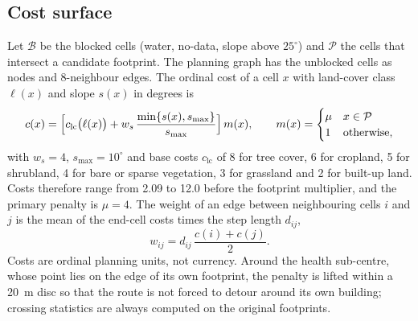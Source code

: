 \subsection{Cost surface}
Let $\mathcal{B}$ be the blocked cells (water, no-data, slope above $25^{\circ}$) and $\mathcal{P}$ the cells that intersect a candidate footprint. The planning graph has the unblocked cells as nodes and 8-neighbour edges. The ordinal cost of a cell $x$ with land-cover class $\ell(x)$ and slope $s(x)$ in degrees is
\begin{equation}
c(x)=\Bigl[c_{\mathrm{lc}}\bigl(\ell(x)\bigr)+w_s\,\frac{\min\{s(x),s_{\max}\}}{s_{\max}}\Bigr]\,m(x),\qquad m(x)=\begin{cases}\mu & x\in\mathcal{P}\\ 1 & \text{otherwise,}\end{cases}
\label{eq:cell}
\end{equation}
with $w_s=4$, $s_{\max}=10^{\circ}$ and base costs $c_{\mathrm{lc}}$ of 8 for tree cover, 6 for cropland, 5 for shrubland, 4 for bare or sparse vegetation, 3 for grassland and 2 for built-up land. Costs therefore range from 2.09 to 12.0 before the footprint multiplier, and the primary penalty is $\mu=4$. The weight of an edge between neighbouring cells $i$ and $j$ is the mean of the end-cell costs times the step length $d_{ij}$,
\begin{equation}
w_{ij}=d_{ij}\,\frac{c(i)+c(j)}{2}.
\label{eq:edge}
\end{equation}
Costs are ordinal planning units, not currency. Around the health sub-centre, whose point lies on the edge of its own footprint, the penalty is lifted within a 20~m disc so that the route is not forced to detour around its own building; crossing statistics are always computed on the original footprints.


